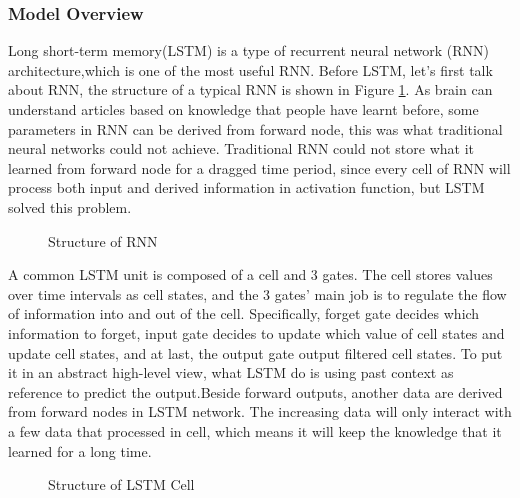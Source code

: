 \documentclass{article}
\begin{document}
\subsubsection{Model Overview}
Long short-term memory(LSTM) is a type of recurrent neural network (RNN) architecture,which is one of the most useful RNN.  Before LSTM, let's first talk about RNN, the structure of a typical RNN is shown in Figure \ref{RNN}. As brain can understand articles based on knowledge that people have learnt before, some parameters in RNN can be derived from forward node, this was what traditional neural networks could not achieve. Traditional RNN could not store what it learned from forward node for a dragged time period, since every cell of RNN will process both input and derived information in activation function, but LSTM solved this problem.
\begin{figure}[h]
  \centering
  \caption{Structure of RNN}
  \label{RNN}
\end{figure} 

A common LSTM unit is composed of a cell and 3 gates. The cell stores values over time intervals as cell states, and the 3 gates’ main job is to regulate the flow of information into and out of the cell. Specifically, forget gate decides which information to forget, input gate decides to update which value of cell states and update cell states, and at last, the output gate output filtered cell states. To put it in an abstract high-level view, what LSTM do is using past context as reference to predict the output.Beside forward outputs, another data are derived from forward nodes in LSTM network. The increasing data will only interact with a few data that processed in cell, which means it will keep the knowledge that it learned for a long time.

\begin{figure}[h]
  \centering
  \caption{Structure of LSTM Cell}
\end{figure} 
\end{document}
